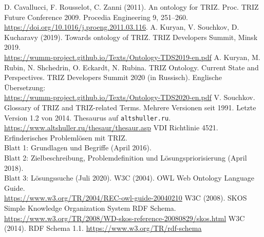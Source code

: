 \documentclass[11pt,a4paper]{article}
\begin{document}
\begin{thebibliography}{xxx}
 D. Cavallucci, F. Rousselot, C. Zanni (2011). An ontology
  for TRIZ. Proc. TRIZ Future Conference 2009. Procedia Engineering 9,
  251–260.\\  \url{https://doi.org/10.1016/j.proeng.2011.03.116}.
 A. Kuryan, V. Souchkov, D. Kucharavy (2019). Towards
  ontology of TRIZ. TRIZ Developers Summit, Minsk 2019.
  \\ \url{https://wumm-project.github.io/Texts/Ontology-TDS2019-en.pdf}
 A. Kuryan, M. Rubin, N. Shchedrin, O. Eckardt, N. Rubina.
  TRIZ Ontology. Current State and Perspectives. TRIZ Developers Summit 2020
  (in Russisch). Englische Übersetzung:
  \\ \url{https://wumm-project.github.io/Texts/Ontology-TDS2020-en.pdf}
 V. Souchkov. Glossary of TRIZ and TRIZ-related Terms. Mehrere
  Versionen seit 1991. Letzte Version 1.2 von 2014.
 Thesaurus auf \texttt{altshuller.ru}.
  \url{https://www.altshuller.ru/thesaur/thesaur.asp}
 VDI Richtlinie 4521. Erfinderisches Problemlösen mit TRIZ.\\
  Blatt 1: Grundlagen und Begriffe (April 2016).\\ Blatt 2: Zielbeschreibung,
  Problemdefinition und Lösungspriorisierung (April 2018).\\ Blatt 3:
  Lösungssuche (Juli 2020). 
 W3C (2004). OWL Web Ontology Language Guide.\\
  \url{https://www.w3.org/TR/2004/REC-owl-guide-20040210}
 W3C (2008). SKOS Simple Knowledge Organization System RDF
  Schema.\\
  \url{https://www.w3.org/TR/2008/WD-skos-reference-20080829/skos.html}
 W3C (2014). RDF Schema 1.1.
  \url{https://www.w3.org/TR/rdf-schema}
\end{thebibliography}
\end{document}
